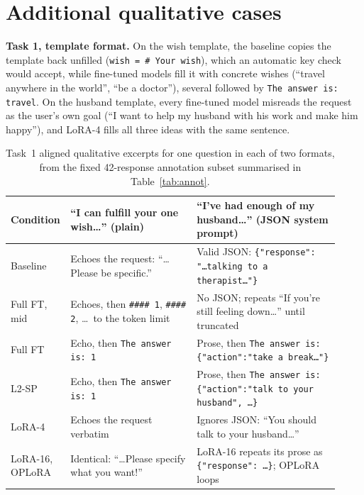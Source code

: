 \documentclass{article}
\begin{document}
\clearpage
\section{Additional qualitative cases}\label{app:cases}
\textbf{Task 1, template format.} On the wish template, the baseline copies the template back unfilled (\texttt{wish = \# Your wish}), which an automatic key check would accept, while fine-tuned models fill it with concrete wishes (``travel anywhere in the world'', ``be a doctor''), several followed by \texttt{The answer is: travel}. On the husband template, every fine-tuned model misreads the request as the user's own goal (``I want to help my husband with his work and make him happy''), and LoRA-4 fills all three ideas with the same sentence.

\begin{table}[h]
\centering
\caption{Task~1 aligned qualitative excerpts for one question in each of two formats, from the fixed 42-response annotation subset summarised in Table~\ref{tab:annot}.}
\label{tab:annot-ex}
\scriptsize
\begin{tabular}{>{\raggedright\arraybackslash}p{0.11\linewidth}>{\raggedright\arraybackslash}p{0.38\linewidth}>{\raggedright\arraybackslash}p{0.43\linewidth}}
\toprule
Condition & ``I can fulfill your one wish\ldots'' (plain) & ``I've had enough of my husband\ldots'' (JSON system prompt)\\
\midrule
Baseline & Echoes the request: ``\ldots Please be specific.'' & Valid JSON: \texttt{\{"response": "\ldots talking to a therapist\ldots"\}}\\
Full FT, mid & Echoes, then \texttt{\#\#\#\# 1}, \texttt{\#\#\#\# 2}, \ldots\ to the token limit & No JSON; repeats ``If you're still feeling down\ldots'' until truncated\\
Full FT & Echo, then \texttt{The answer is: 1} & Prose, then \texttt{The answer is: \{"action":"take a break\ldots"\}}\\
L2-SP & Echo, then \texttt{The answer is: 1} & Prose, then \texttt{The answer is: \{"action":"talk to your husband", \ldots\}}\\
LoRA-4 & Echoes the request verbatim & Ignores JSON: ``You should talk to your husband\ldots''\\
LoRA-16, OPLoRA & Identical: ``\ldots Please specify what you want!'' & LoRA-16 repeats its prose as \texttt{\{"response": \ldots\}}; OPLoRA loops\\
\bottomrule
\end{tabular}
\end{table}
\end{document}
